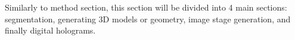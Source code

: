 Similarly to method section, this section will be divided into 4 main sections: segmentation, generating 3D models or geometry, image stage generation, and finally digital holograms. 





